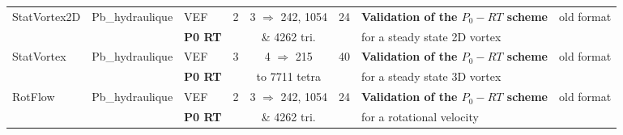 \begin{table}[H]
\begin{centering}
\begin{tabular}{lclccclc}
\hline
\rowcolor{LimeGreen!10}StatVortex2D & Pb\_hydraulique & VEF & 2 & 3 $\Rightarrow$ 242, 1054 & 24 & \textbf{Validation of the $P_0-RT$ scheme} & old format \\ 
\rowcolor{LimeGreen!10} & & \textbf{P0 RT} & & \& 4262 tri. & & for a steady state 2D vortex &  \\
\hline
\rowcolor{LimeGreen!10}StatVortex & Pb\_hydraulique & VEF & 3 & 4 $\Rightarrow$ 215 & 40 & \textbf{Validation of the $P_0-RT$ scheme} & old format \\ 
\rowcolor{LimeGreen!10} & & \textbf{P0 RT} & & to 7711 tetra & & for a steady state 3D vortex & \\
\hline
\rowcolor{LimeGreen!10}RotFlow & Pb\_hydraulique & VEF & 2 & 3 $\Rightarrow$ 242, 1054 & 24 & \textbf{Validation of the $P_0-RT$ scheme} & old format \\ 
\rowcolor{LimeGreen!10} & & \textbf{P0 RT} & & \& 4262 tri. & & for a rotational velocity & \\
\hline
\end{tabular}
\end{centering}
\end{table}


\newpage

